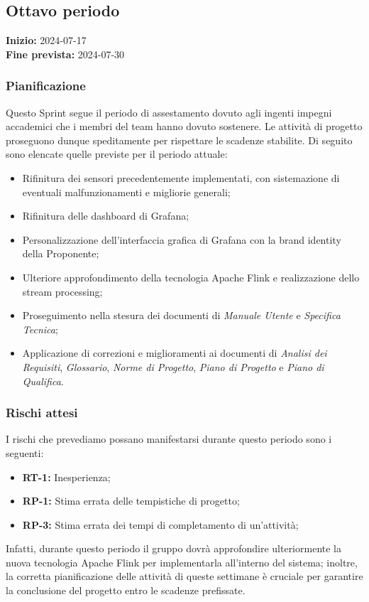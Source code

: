 \documentclass[8pt]{article}
\begin{document}
\subsection{Ottavo periodo}
\textbf{Inizio:} 2024-07-17\\
\textbf{Fine prevista:} 2024-07-30
\subsubsection{Pianificazione}
Questo Sprint segue il periodo di assestamento dovuto agli ingenti impegni accademici che i membri del team hanno dovuto sostenere. Le attività di progetto proseguono dunque speditamente per rispettare le scadenze stabilite. Di seguito sono elencate quelle previste per il periodo attuale:
\begin{itemize}
\setlength\itemsep{0em}
    \item Rifinitura dei sensori precedentemente implementati, con sistemazione di eventuali malfunzionamenti e migliorie generali;
    \item Rifinitura delle dashboard di Grafana;
    \item Personalizzazione dell'interfaccia grafica di Grafana con la brand identity della Proponente;
    \item Ulteriore approfondimento della tecnologia Apache Flink e realizzazione dello stream processing;
    \item Proseguimento nella stesura dei documenti di \textit{Manuale Utente} e \textit{Specifica Tecnica};
    \item Applicazione di correzioni e miglioramenti ai documenti di \textit{Analisi dei Requisiti}, \textit{Glossario}, \textit{Norme di Progetto}, \textit{Piano di Progetto} e \textit{Piano di Qualifica}.
\end{itemize}
\subsubsection{Rischi attesi}
I rischi che prevediamo possano manifestarsi durante questo periodo sono i seguenti:
\begin{itemize}
\setlength\itemsep{0em}
    \item \textbf{RT-1:} Inesperienza;
    \item \textbf{RP-1:} Stima errata delle tempistiche di progetto;
    \item \textbf{RP-3:} Stima errata dei tempi di completamento di un'attività;
\end{itemize}
Infatti, durante questo periodo il gruppo dovrà approfondire ulteriormente la nuova tecnologia Apache Flink per implementarla all'interno del sistema; inoltre, la corretta pianificazione delle attività di queste settimane è cruciale per garantire la conclusione del progetto entro le scadenze prefissate.
\newpage
\end{document}

